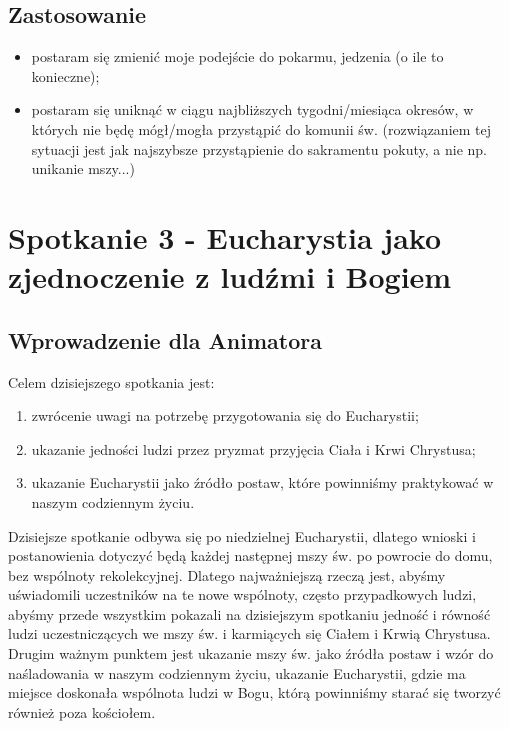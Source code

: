 \documentclass[a5paper,10pt,polish]{book}
\begin{document}
\section{Zastosowanie}
\label{babice2006-jesien-knurow/spotkanie2:zastosowanie}\begin{itemize}
\item {} 
postaram się zmienić moje podejście do pokarmu, jedzenia (o ile to konieczne);

\item {} 
postaram się uniknąć w ciągu najbliższych tygodni/miesiąca okresów, w których nie będę mógł/mogła przystąpić do komunii św. (rozwiązaniem tej sytuacji jest jak najszybsze przystąpienie do sakramentu pokuty, a nie np. unikanie mszy...)

\end{itemize}


\chapter{Spotkanie 3 - Eucharystia jako zjednoczenie z ludźmi i Bogiem}
\label{babice2006-jesien-knurow/spotkanie3:spotkanie-3-eucharystia-jako-zjednoczenie-z-ludzmi-i-bogiem}\label{babice2006-jesien-knurow/spotkanie3::doc}

\section{Wprowadzenie dla Animatora}
\label{babice2006-jesien-knurow/spotkanie3:wprowadzenie-dla-animatora}
Celem dzisiejszego spotkania jest:
\begin{enumerate}
\item {} 
zwrócenie uwagi na potrzebę przygotowania się do Eucharystii;

\item {} 
ukazanie jedności ludzi przez pryzmat przyjęcia Ciała i Krwi Chrystusa;

\item {} 
ukazanie Eucharystii jako źródło postaw, które powinniśmy praktykować w naszym codziennym życiu.

\end{enumerate}

Dzisiejsze spotkanie odbywa się po niedzielnej Eucharystii, dlatego wnioski i postanowienia dotyczyć będą każdej następnej mszy św. po powrocie do domu, bez wspólnoty rekolekcyjnej. Dlatego najważniejszą rzeczą jest, abyśmy uświadomili uczestników na te nowe wspólnoty, często przypadkowych ludzi, abyśmy przede wszystkim pokazali na dzisiejszym spotkaniu jedność i równość ludzi uczestniczących we mszy św. i karmiących się Ciałem i Krwią Chrystusa. Drugim ważnym punktem jest ukazanie mszy św. jako źródła postaw i wzór do naśladowania w naszym codziennym życiu, ukazanie Eucharystii, gdzie ma miejsce doskonała wspólnota ludzi w Bogu, którą powinniśmy starać się tworzyć również poza kościołem.
\end{document}
